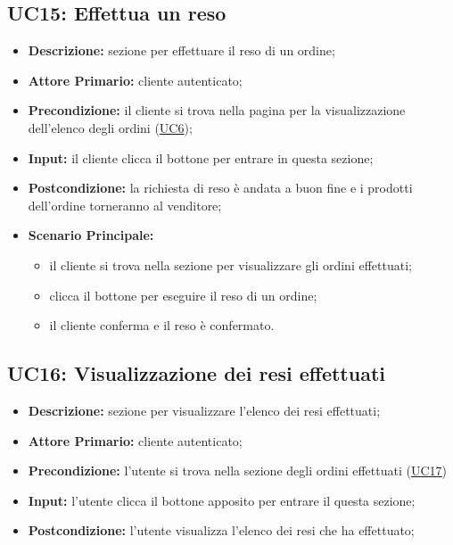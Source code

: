         \subsection{UC15: Effettua un reso}
        \label{sec:UC15}
        \begin{itemize}
            \item \textbf{Descrizione:} sezione per effettuare il reso di un ordine;
            \item \textbf{Attore Primario:} cliente autenticato;
            \item \textbf{Precondizione:} il cliente si trova nella pagina per la visualizzazione dell'elenco degli ordini (\hyperref[sec:UC6]{\underline{UC6}});
            \item \textbf{Input:} il cliente clicca il bottone per entrare in questa sezione;
            \item \textbf{Postcondizione:} la richiesta di reso è andata a buon fine e i prodotti dell'ordine torneranno al venditore;
            \item \textbf{Scenario Principale:}
                \begin{itemize}
                    \item il cliente si trova nella sezione per visualizzare gli ordini effettuati;
                    \item clicca il bottone per eseguire il reso di un ordine;
                    \item il cliente conferma e il reso è confermato.
                \end{itemize}
        \end{itemize}

        \subsection{UC16: Visualizzazione dei resi effettuati}
        \label{sec:UC16}
        \begin{itemize}
            \item \textbf{Descrizione:} sezione per visualizzare l'elenco dei resi effettuati;
            \item \textbf{Attore Primario:} cliente autenticato;
            \item \textbf{Precondizione:} l'utente si trova nella sezione degli ordini effettuati (\hyperref[sec:UC17]{\underline{UC17}})
            \item \textbf{Input:} l'utente clicca il bottone apposito per entrare il questa sezione;
            \item \textbf{Postcondizione:} l'utente visualizza l'elenco dei resi che ha effettuato;
        \end{itemize}
